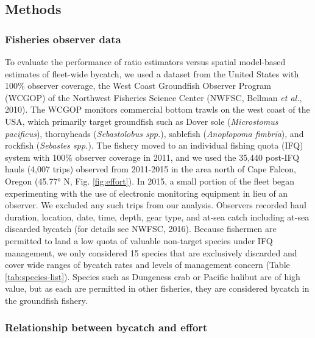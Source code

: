 \documentclass[]{article}
\begin{document}
\hypertarget{methods}{%
\subsection{Methods}\label{methods}}

\hypertarget{fisheries-observer-data}{%
\subsubsection{Fisheries observer data}\label{fisheries-observer-data}}

To evaluate the performance of ratio estimators versus spatial
model-based estimates of fleet-wide bycatch, we used a dataset from the
United States with 100\% observer coverage, the West Coast Groundfish
Observer Program (WCGOP) of the Northwest Fisheries Science Center
(NWFSC, Bellman \emph{et al.}, 2010). The WCGOP monitors commercial
bottom trawls on the west coast of the USA, which primarily target
groundfish such as Dover sole (\emph{Microstomus pacificus}),
thornyheads (\emph{Sebastolobus spp.}), sablefish (\emph{Anoplopoma
fimbria}), and rockfish (\emph{Sebastes spp.}). The fishery moved to an
individual fishing quota (IFQ) system with 100\% observer coverage in
2011, and we used the 35,440 post-IFQ hauls (4,007 trips) observed from
2011-2015 in the area north of Cape Falcon, Oregon (45.77° N, Fig.
\ref{fig:effort}). In 2015, a small portion of the fleet began
experimenting with the use of electronic monitoring equipment in lieu of
an observer. We excluded any such trips from our analysis. Observers
recorded haul duration, location, date, time, depth, gear type, and
at-sea catch including at-sea discarded bycatch (for details see NWFSC,
2016). Because fishermen are permitted to land a low quota of valuable
non-target species under IFQ management, we only considered 15 species
that are exclusively discarded and cover wide ranges of bycatch rates
and levels of management concern (Table \ref{tab:species-list}). Species
such as Dungeness crab or Pacific halibut are of high value, but as each
are permitted in other fisheries, they are considered bycatch in the
groundfish fishery.

\hypertarget{relationship-between-bycatch-and-effort}{%
\subsubsection{Relationship between bycatch and
effort}\label{relationship-between-bycatch-and-effort}}
\end{document}

